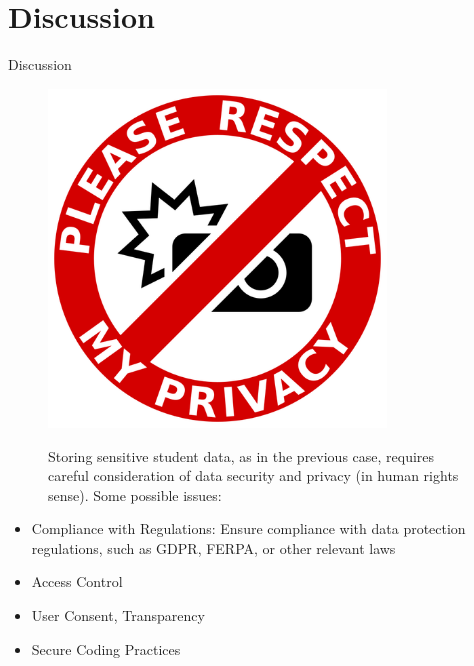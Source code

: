 \section{Discussion}

\begin{frame}{Discussion}

    \begin{figure}
        \centering
        \begin{minipage}{.25\textwidth}
          \centering
          \includegraphics[width=0.8\textwidth]{../../images/privacy.png}
        \end{minipage}%
        \begin{minipage}{.7\textwidth}
            Storing sensitive student data, as in the previous case, requires careful consideration 
            of data security and privacy (in human rights sense). 
            Some possible issues:
        \end{minipage}
    \end{figure}

    \begin{itemize}[<+-|alert@+>]\color{gray}
        \item Compliance with Regulations: Ensure compliance with data protection regulations, such as GDPR, FERPA, or other relevant laws
        \item Access Control
        \item User Consent, Transparency
        \item Secure Coding Practices
    \end{itemize}
    
\end{frame}

